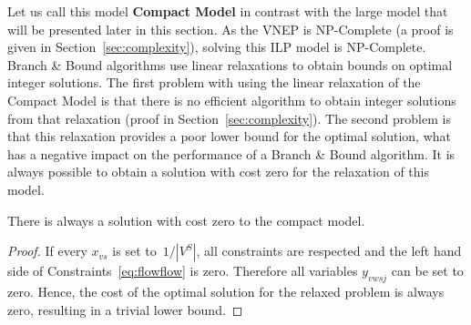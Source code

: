 Let us call this model \textbf{Compact Model} in contrast with the large model that will be presented later in this section.
As the VNEP is NP-Complete (a proof is given in Section~\ref{sec:complexity}), solving this ILP model is NP-Complete.
Branch \& Bound algorithms use linear relaxations to obtain bounds on optimal integer solutions.
The first problem with using the linear relaxation of the Compact Model is that there is no efficient algorithm to obtain integer solutions from that relaxation (proof in Section~\ref{sec:complexity}).
The second problem is that this relaxation provides a poor lower bound for the optimal solution, what has a negative impact on the performance of a Branch \& Bound algorithm.
It is always possible to obtain a solution with cost zero for the relaxation of this model.

\begin{proposition}
There is always a solution with cost zero to the compact model.
\end{proposition}

\begin{proof}
If every $x_{vs}$ is set to~$1 / |V^S| $, all constraints are respected and the left hand side of Constraints~\eqref{eq:flowflow} is zero. 
Therefore all variables $y_{vwsj}$ can be set to zero.
Hence, the cost of the optimal solution for the relaxed problem is always zero, resulting in a trivial lower bound.
\end{proof}
\vspace{-0.5cm}

